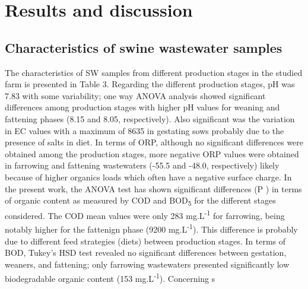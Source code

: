 \section{Results and discussion}
\subsection{Characteristics of swine wastewater samples}
The characteristics of SW samples from different production stages in the studied farm is presented in Table 3. Regarding the different production stages, pH was 7.83 with some variability; one way ANOVA analysis showed significant differences among production stages with higher pH values for weaning and fattening phases (8.15 and 8.05, respectively). Also significant was the variation in EC values with a maximum of 8635 in gestating sows probably due to the presence of salts in diet. In terms of ORP, although no significant differences were obtained among the production stages, more negative ORP values were obtained in farrowing and fattening wastewaters (-55.5 and -48.0, respectively) likely because of higher organics loads which often have a negative surface charge.
In the present work, the ANOVA test has shown significant differences (P ) in terms of organic content as measured by COD and BOD\textsubscript{5} for the different stages considered. The COD mean values were only 283 mg.L\textsuperscript{-1} for farrowing, being notably higher for the fattenign phase (9200 mg.L\textsuperscript{-1}). This difference is probably due to different feed strategies (diets) between production stages. In terms of BOD, Tukey’s HSD test revealed no significant differences between gestation, weaners, and fattening; only farrowing wastewaters presented significantly low biodegradable organic content (153 mg.L\textsuperscript{-1}).
Concerning s